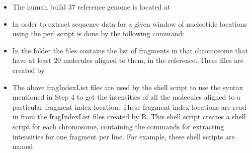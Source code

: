 \documentclass[11pt]{article}
\begin{document}
\begin{itemize}
\item
The human build 37 reference genome is located at 

\item
In order to extract sequence data for a given window of nucleotide locations using the perl script  
is done by the following command:

\item
In the folder 
the files  
contains the list of fragments in that chromosome that have at least 20 molecules aligned to them, in the reference. These files are created by  

\item
The above fragIndexList files are used by the shell script 
to use the syntax mentioned in Step 4 to get the intensities of all the molecules aligned to a particular fragment index location. These fragment index locations are read in from the fragIndexList files created by R. This shell script creates a shell script for each chromosome, containing the commands for extracting intensities for one fragment per line. For example, these shell scripts are named 


\end{itemize}
\end{document}
